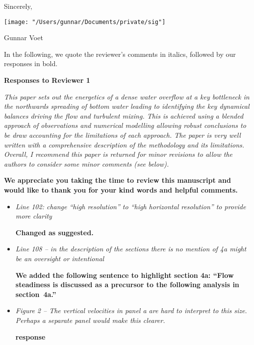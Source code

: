 \documentclass[11pt]{article}
\begin{document}
\begin{flushleft}
Sincerely,

\texttt{[image: "/Users/gunnar/Documents/private/sig"]}


Gunnar Voet

\clearpage
In the following, we quote the reviewer's comments in italics, followed by our responses in bold.\\
\vspace{0.2in}

\centerline{\bf Responses to Reviewer 1}
\vspace{0.05in}



\it
This paper sets out the energetics of a dense water overflow at a key bottleneck in the northwards spreading of bottom water leading to identifying the key dynamical balances driving the flow and turbulent mixing. This is achieved using a blended approach of observations and numerical modelling allowing robust conclusions to be draw accounting for the limitations of each approach. The paper is very well written with a comprehensive description of the methodology and its limitations. Overall, I recommend this paper is returned for minor revisions to allow the authors to consider some minor comments (see below).

\vspace{0.05in}
\bf
We appreciate you taking the time to review this manuscript and would like to thank you for your kind words and helpful comments.

\begin{itemize}
\item \it
Line 102: change ``high resolution'' to ``high horizontal resolution'' to provide more clarity

\bf
Changed as suggested.

\item \it
Line 108 -- in the description of the sections there is no mention of 4a might be an oversight or intentional

\bf
We added the following sentence to highlight section 4a: ``Flow steadiness is discussed as a precursor to the following analysis in section~4a.''

\item \it
Figure 2 -- The vertical velocities in panel a are hard to interpret to this size. Perhaps a separate panel would make this clearer.

\bf
response


\end{itemize}
\end{flushleft}
\end{document}
